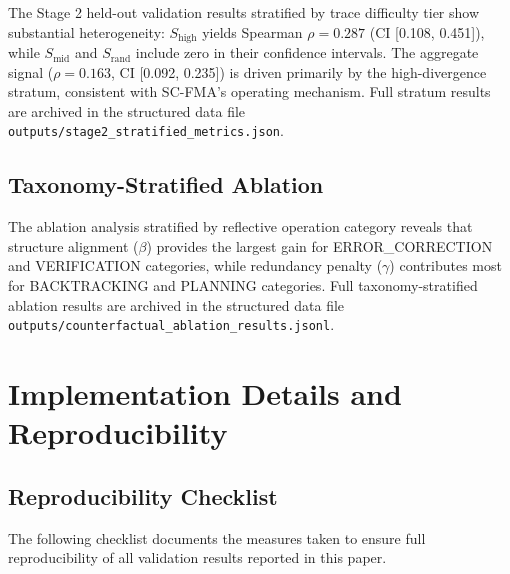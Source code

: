 \documentclass[a4paper,fleqn]{cas-sc}
\begin{document}
The Stage 2 held-out validation results stratified by trace difficulty tier show substantial heterogeneity: $S_{\text{high}}$ yields Spearman $\rho = 0.287$ (CI [0.108, 0.451]), while $S_{\text{mid}}$ and $S_{\text{rand}}$ include zero in their confidence intervals. The aggregate signal ($\rho = 0.163$, CI [0.092, 0.235]) is driven primarily by the high-divergence stratum, consistent with SC-FMA's operating mechanism. Full stratum results are archived in the structured data file \texttt{outputs/stage2\_stratified\_metrics.json}.

\subsection{Taxonomy-Stratified Ablation}
\label{app:taxonomy-ablation}

The ablation analysis stratified by reflective operation category reveals that structure alignment ($\beta$) provides the largest gain for ERROR\_CORRECTION and VERIFICATION categories, while redundancy penalty ($\gamma$) contributes most for BACKTRACKING and PLANNING categories. Full taxonomy-stratified ablation results are archived in the structured data file \texttt{outputs/counterfactual\_ablation\_results.jsonl}.

\section{Implementation Details and Reproducibility}
\label{app:implementation}

\subsection{Reproducibility Checklist}
\label{app:repro-checklist}

The following checklist documents the measures taken to ensure full reproducibility of all validation results reported in this paper.
\end{document}
